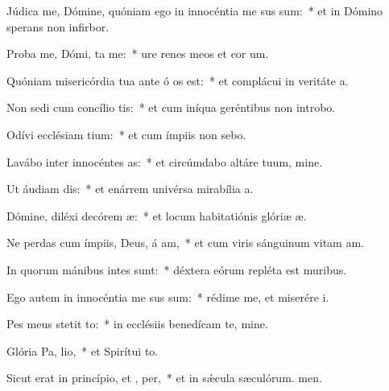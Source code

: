 \item Júdica me, Dómine, quóniam ego in innocéntia me sus sum:~* et in Dómino sperans non infirbor.
\item Proba me, Dómi,  ta me:~* ure renes meos et cor um.
\item Quóniam misericórdia tua ante ó os est:~* et complácui in veritáte a.
\item Non sedi cum concílio tis:~* et cum iníqua geréntibus non introbo.
\item Odívi ecclésiam tium:~* et cum ímpiis non sebo.
\item Lavábo inter innocéntes  as:~* et circúmdabo altáre tuum, mine.
\item Ut áudiam  dis:~* et enárrem univérsa mirabília a.
\item Dómine, diléxi decórem  æ:~* et locum habitatiónis glóriæ æ.
\item Ne perdas cum ímpiis, Deus, á am,~* et cum viris sánguinum vitam am.
\item In quorum mánibus intes sunt:~* déxtera eórum repléta est muribus.
\item Ego autem in innocéntia me sus sum:~* rédime me, et miserére i.
\item Pes meus stetit  to:~* in ecclésiis benedícam te, mine.
\item Glória Pa,  lio,~* et Spirítui to.
\item Sicut erat in princípio, et ,  per,~* et in sǽcula sæculórum. men.
